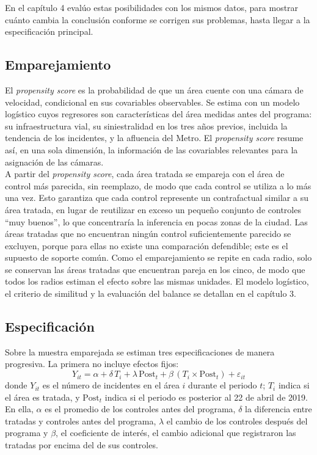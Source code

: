En el capítulo 4 evalúo estas posibilidades con los mismos datos, para mostrar cuánto cambia la conclusión conforme se corrigen sus problemas, hasta llegar a la especificación principal.\\

\subsection{Emparejamiento}
\noindent El \emph{propensity score} es la probabilidad de que un área cuente con una cámara de velocidad, condicional en sus covariables observables. Se estima con un modelo logístico cuyos regresores son características del área medidas antes del programa: su infraestructura vial, su siniestralidad en los tres años previos, incluida la tendencia de los incidentes, y la afluencia del Metro. El \emph{propensity score} resume así, en una sola dimensión, la información de las covariables relevantes para la asignación de las cámaras.\\

A partir del \emph{propensity score}, cada área tratada se empareja con el área de control más parecida, sin reemplazo, de modo que cada control se utiliza a lo más una vez. Esto garantiza que cada control represente un contrafactual similar a su área tratada, en lugar de reutilizar en exceso un pequeño conjunto de controles ``muy buenos'', lo que concentraría la inferencia en pocas zonas de la ciudad. Las áreas tratadas que no encuentran ningún control suficientemente parecido se excluyen, porque para ellas no existe una comparación defendible; este es el supuesto de soporte común. Como el emparejamiento se repite en cada radio, solo se conservan las áreas tratadas que encuentran pareja en los cinco, de modo que todos los radios estiman el efecto sobre las mismas unidades. El modelo logístico, el criterio de similitud y la evaluación del balance se detallan en el capítulo 3.\\

\subsection{Especificación}
\label{sec:especificacion}
\noindent Sobre la muestra emparejada se estiman tres especificaciones de manera progresiva. La primera no incluye efectos fijos:
\begin{equation}
    Y_{it} = \alpha + \delta \, T_i + \lambda \, \text{Post}_t + \beta \, (T_i \times \text{Post}_t) + \varepsilon_{it}
    \label{eq:did1}
\end{equation}
donde $Y_{it}$ es el número de incidentes en el área $i$ durante el periodo $t$; $T_i$ indica si el área es tratada, y $\text{Post}_t$ indica si el periodo es posterior al 22 de abril de 2019. En ella, $\alpha$ es el promedio de los controles antes del programa, $\delta$ la diferencia entre tratadas y controles antes del programa, $\lambda$ el cambio de los controles después del programa y $\beta$, el coeficiente de interés, el cambio adicional que registraron las tratadas por encima del de sus controles.\\

